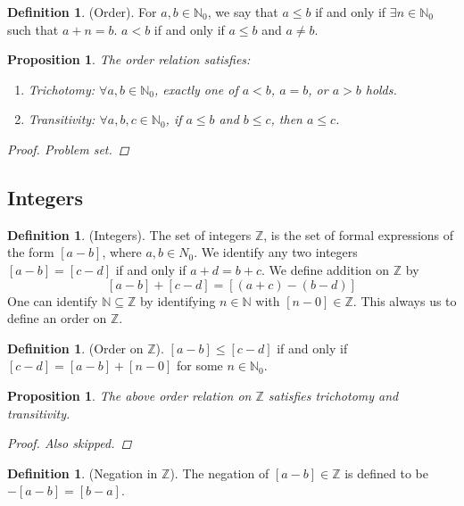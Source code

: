 \documentclass[10pt]{article}
\newcommand{\N}{\mathbb{N}}
\newcommand{\Z}{\mathbb{Z}}
\newtheorem{proposition}[theorem]{Proposition}
\theoremstyle{definition}
\newtheorem{definition}[theorem]{Definition}
\theoremstyle{remark}
\begin{document}
\begin{definition}
    (Order).
    For $a, b \in \N_0$, we say that $a \leq b$ if and only if $\exists n \in \N_0$ such that $a + n = b$.
    $a < b$ if and only if $a \leq b$ and $a \neq b$.
\end{definition}

\begin{proposition}
    The order relation satisfies:
    \begin{enumerate}
        \item Trichotomy: $\forall a, b \in \N_0$, exactly one of $a < b$, $a = b$, or $a > b$ holds.
        \item Transitivity: $\forall a, b, c \in \N_0$, if $a \leq b$ and $b \leq c$, then $a \leq c$.
    \end{enumerate}
    \begin{proof}
        Problem set.
    \end{proof}
\end{proposition}

\subsection{Integers}

\begin{definition}
    (Integers).
    The set of integers $\Z$, is the set of formal expressions of the form $[a - b]$, where $a, b \in N_0$.
    We identify any two integers $[a - b] = [c - d]$ if and only if $a + d = b + c$.
    We define addition on $\Z$ by
    $$[a - b] + [c - d] = [(a + c) - (b - d)]$$
    One can identify $\N \subseteq \Z$ by identifying $n \in \N$ with $[n - 0] \in \Z$.
    This always us to define an order on $\Z$.
\end{definition}

\begin{definition}
    (Order on $\Z$).
    $[a - b] \leq [c - d]$ if and only if $[c - d] = [a - b] + [n - 0]$ for some $n \in \N_0$.
\end{definition}

\begin{proposition}
    The above order relation on $\Z$ satisfies trichotomy and transitivity.
    \begin{proof}
        Also skipped.
    \end{proof}
\end{proposition}

\begin{definition}
    (Negation in $\Z$).
    The negation of $[a - b] \in \Z$ is defined to be $-[a - b] = [b - a]$.
\end{definition}
\end{document}
